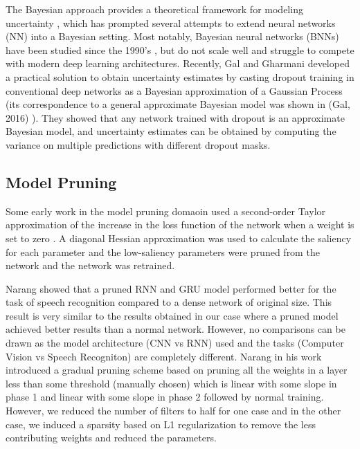 The Bayesian approach provides a theoretical framework for modeling uncertainty \cite{gal2015bayesian}, which has prompted several attempts to extend neural networks (NN) into a Bayesian setting. Most notably, Bayesian neural networks (BNNs) have been studied since the 1990’s \cite{neal2012bayesian}, but do not scale well and struggle to compete with modern deep learning architectures. Recently, Gal and Gharmani \cite{gal2015bayesian} developed a practical solution to obtain
uncertainty estimates by casting dropout training in conventional
deep networks as a Bayesian approximation of a
Gaussian Process (its correspondence to a general approximate
Bayesian model was shown in (Gal, 2016) \cite{Gal2015Dropout}). They
showed that any network trained with dropout is an approximate
Bayesian model, and uncertainty estimates can be obtained by computing the variance on multiple predictions with different dropout masks.

\subsection{Model Pruning}

Some early work in the model pruning domaoin used a second-order Taylor approximation of the increase in the loss function of the network when a weight is set to zero \cite{lecun1990optimal}. A diagonal Hessian approximation was used to calculate the saliency for each parameter \cite{lecun1990optimal} and the low-saliency parameters were pruned from the network and the network was retrained.


Narang \cite{DBLP:journals/corr/NarangDSE17} showed that a pruned RNN and GRU model performed better for the task of speech recognition compared to a dense network of original size. This result is very similar to the results obtained in our case where a pruned model achieved better results than a normal network. However, no comparisons can be drawn as the model architecture (CNN vs RNN) used and the tasks (Computer Vision vs Speech Recogniton) are completely different.  Narang \cite{DBLP:journals/corr/NarangDSE17} in his work introduced a gradual pruning scheme based on pruning all the weights in a layer
less than some threshold (manually chosen) which is linear with some
slope in phase 1 and linear with some slope in phase 2 followed by
normal training. However, we reduced the number of filters to half for one case and in the other case, we induced a sparsity based on L1 regularization to remove the less contributing weights and reduced the parameters. 


